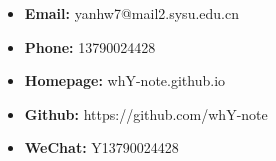 \documentclass[]{awesome-cv}
\begin{document}
\begin{itemize}
	\item \textbf{Email:}  yanhw7@mail2.sysu.edu.cn
	\item \textbf{Phone:} 13790024428
	\item \textbf{Homepage:} whY-note.github.io
	\item \textbf{Github:} https://github.com/whY-note
	\item \textbf{WeChat:} Y13790024428
\end{itemize}
\end{document}

